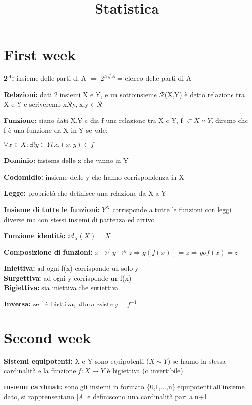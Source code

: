 \documentclass[11pt, letterpaper]{article}
\title{Statistica}
\begin{document}
    
\section{First week}
\textbf{2$^{A}$:} insieme delle parti di A $\Rightarrow\ 2^{\wedge\#A}$ = elenco delle parti di A

\textbf{Relazioni:} dati 2 insiemi X e Y, e un sottoinsieme $\mathcal{R}$(X,Y) è detto relazione tra 
X e Y e scriveremo x$\mathcal{R}$y, x,y$\in\mathcal{R}$

\textbf{Funzione:} siano dati X,Y e dia f una relazione tra X e Y, f $\subset X\times Y$.
diremo che f è una funzione da X in Y se vale:
\begin{center}
    $\forall x \in X: \exists ! y \in Y t.c. (x,y)\in f$
\end{center}

\textbf{Dominio:} insieme delle x che vanno in Y

\textbf{Codomidio:} insieme delle y che hanno corrispondenza in X

\textbf{Legge:} proprietà che definisce una relazione da X a Y

\textbf{Insieme di tutte le funzioni:} $Y^{X}$ corrisponde a tutte le funzioni con leggi diverse ma
con stessi insiemi di partenza ed arrivo

\textbf{Funzione identità:} $id_{X}(X) = X$

\textbf{Composizione di funzioni:} $x\rightarrow^{f} y\rightarrow^{g} z \Rightarrow g(f(x)) = z
\Rightarrow gof(x) = z$ 

\textbf{Iniettiva:} ad ogni f(x) corrisponde un solo y\\
\textbf{Surgettiva:} ad ogni y corrisponde un f(x)\\
\textbf{Bigiettiva:} sia iniettiva che suriettiva

\textbf{Inversa:} se f è biettiva, allora esiste $g=f^{-1}$

\newpage
\section{Second week}

\textbf{Sistemi equipotenti:} X e Y sono equipotenti ($X\sim Y$) se hanno la stessa
cardinalità e la funzione $f:X\rightarrow Y$ è bigiettiva (o invertibile)

\textbf{insiemi cardinali:} sono gli insiemi in formato \{0,1,...,n\} equipotenti all'insieme dato, si 
rapprensentano $|A|$ e definiscono una cardinalità pari a n+1
\end{document}
